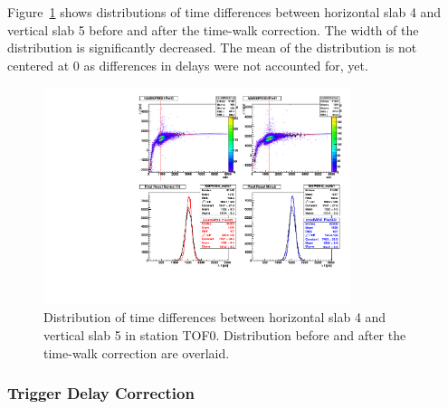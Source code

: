 Figure~\ref{fig:SlabDTTW} shows distributions of time differences
between horizontal slab 4 and vertical slab 5 before and after the
time-walk correction. The width of the distribution is significantly
decreased. The mean of the distribution is not centered at 0 as
differences in delays \Tzero{} were not accounted for, yet.

\begin{figure}
  \begin{center}
  \includegraphics[clip,trim=0 0 10cm 8.5cm, width=9cm]{02_slab_dt_resolution_tw_effect}
  \caption{Distribution of time differences \DT{} between horizontal slab 4 and
    vertical slab 5 in station TOF0. Distribution before and after the
  time-walk correction are overlaid.}
  \label{fig:SlabDTTW}
  \end{center}
\end{figure}


\subsubsection{Trigger Delay Correction}

\newcommand{\Tdelay}[2]{\ensuremath{T_{\text{tr}}^{#1,#2}}}
\newcommand{\TW}{\ensuremath{\text{TW}}}
\newcommand{\PMT}{\ensuremath{\text{PMT}}}
\newcommand{\ttrig}[2]{\ensuremath{{t}_{#2}^{#1}}}
\newcommand{\mean}[1]{\ensuremath{\left< #1 \right>}}

